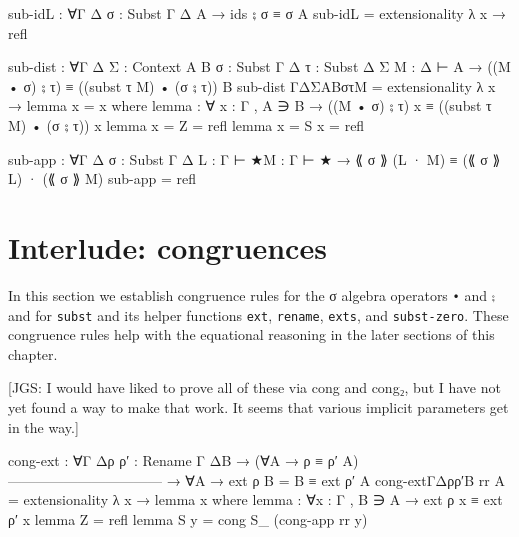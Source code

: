 \begin{fence}
\begin{code}
sub-idL : ∀{Γ Δ} {σ : Subst Γ Δ} {A}
       → ids ⨟ σ ≡ σ {A}
sub-idL = extensionality λ x → refl
\end{code}
\end{fence}

\begin{fence}
\begin{code}
sub-dist :  ∀{Γ Δ Σ : Context} {A B} {σ : Subst Γ Δ} {τ : Subst Δ Σ}
              {M : Δ ⊢ A}
         → ((M • σ) ⨟ τ) ≡ ((subst τ M) • (σ ⨟ τ)) {B}
sub-dist {Γ}{Δ}{Σ}{A}{B}{σ}{τ}{M} = extensionality λ x → lemma {x = x}
  where
  lemma : ∀ {x : Γ , A ∋ B} → ((M • σ) ⨟ τ) x ≡ ((subst τ M) • (σ ⨟ τ)) x
  lemma {x = Z} = refl
  lemma {x = S x} = refl
\end{code}
\end{fence}

\begin{fence}
\begin{code}
sub-app : ∀{Γ Δ} {σ : Subst Γ Δ} {L : Γ ⊢ ★}{M : Γ ⊢ ★}
        → ⟪ σ ⟫ (L · M)  ≡ (⟪ σ ⟫ L) · (⟪ σ ⟫ M)
sub-app = refl
\end{code}
\end{fence}

\hypertarget{interlude-congruences}{%
\section{Interlude: congruences}\label{interlude-congruences}}

In this section we establish congruence rules for the σ algebra
operators \texttt{•} and \texttt{⨟} and for \texttt{subst} and its
helper functions \texttt{ext}, \texttt{rename}, \texttt{exts}, and
\texttt{subst-zero}. These congruence rules help with the equational
reasoning in the later sections of this chapter.

{[}JGS: I would have liked to prove all of these via cong and cong₂, but
I have not yet found a way to make that work. It seems that various
implicit parameters get in the way.{]}

\begin{fence}
\begin{code}
cong-ext : ∀{Γ Δ}{ρ ρ′ : Rename Γ Δ}{B}
   → (∀{A} → ρ ≡ ρ′ {A})
     ---------------------------------
   → ∀{A} → ext ρ {B = B} ≡ ext ρ′ {A}
cong-ext{Γ}{Δ}{ρ}{ρ′}{B} rr {A} = extensionality λ x → lemma {x}
  where
  lemma : ∀{x : Γ , B ∋ A} → ext ρ x ≡ ext ρ′ x
  lemma {Z} = refl
  lemma {S y} = cong S_ (cong-app rr y)
\end{code}
\end{fence}

